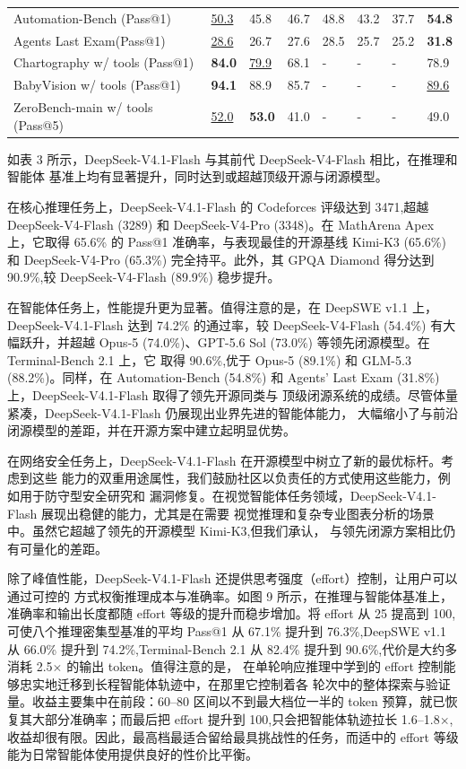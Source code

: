 \documentclass[
  10
]{article}
\begin{document}
{\begin{longtable}[]{@{}L{15.0em}lllllll@{}}
Automation-Bench (Pass@1) & \underline{50.3} & 45.8 & 46.7 & 48.8 & 43.2 & 37.7 &
\textbf{54.8} \\
Agents\textquotesingle{} Last Exam(Pass@1) & \underline{28.6} & 26.7 & 27.6 & 28.5 &
25.7 & 25.2 & \textbf{31.8} \\
Chartography w/ tools (Pass@1) & \textbf{84.0} & \underline{79.9} & 68.1 & - & - & - & 78.9 \\
BabyVision w/ tools (Pass@1) & \textbf{94.1} & 88.9 & 85.7 & - & - & - & \underline{89.6} \\
ZeroBench-main w/ tools (Pass@5) & \underline{52.0} & \textbf{53.0} & 41.0 & - & - & - & 49.0 \\
\end{longtable}
}

如表 3 所示，DeepSeek-V4.1-Flash 与其前代 DeepSeek-V4-Flash 相比，在推理和智能体
基准上均有显著提升，同时达到或超越顶级开源与闭源模型。

在核心推理任务上，DeepSeek-V4.1-Flash 的 Codeforces 评级达到 3471,超越
DeepSeek-V4-Flash (3289) 和 DeepSeek-V4-Pro (3348)。在 MathArena Apex 上，它取得
65.6\% 的 Pass@1 准确率，与表现最佳的开源基线 Kimi-K3 (65.6\%) 和
DeepSeek-V4-Pro (65.3\%) 完全持平。此外，其 GPQA Diamond 得分达到 90.9\%,较
DeepSeek-V4-Flash (89.9\%) 稳步提升。

在智能体任务上，性能提升更为显著。值得注意的是，在 DeepSWE v1.1 上，DeepSeek-V4.1-Flash
达到 74.2\% 的通过率，较 DeepSeek-V4-Flash (54.4\%) 有大幅跃升，并超越
Opus-5 (74.0\%)、GPT-5.6 Sol (73.0\%) 等领先闭源模型。在 Terminal-Bench 2.1 上，它
取得 90.6\%,优于 Opus-5 (89.1\%) 和 GLM-5.3 (88.2\%)。同样，在 Automation-Bench
(54.8\%) 和 Agents' Last Exam (31.8\%) 上，DeepSeek-V4.1-Flash 取得了领先开源同类与
顶级闭源系统的成绩。尽管体量紧凑，DeepSeek-V4.1-Flash 仍展现出业界先进的智能体能力，
大幅缩小了与前沿闭源模型的差距，并在开源方案中建立起明显优势。

在网络安全任务上，DeepSeek-V4.1-Flash 在开源模型中树立了新的最优标杆。考虑到这些
能力的双重用途属性，我们鼓励社区以负责任的方式使用这些能力，例如用于防守型安全研究和
漏洞修复。在视觉智能体任务领域，DeepSeek-V4.1-Flash 展现出稳健的能力，尤其是在需要
视觉推理和复杂专业图表分析的场景中。虽然它超越了领先的开源模型 Kimi-K3,但我们承认，
与领先闭源方案相比仍有可量化的差距。



除了峰值性能，DeepSeek-V4.1-Flash 还提供思考强度（effort）控制，让用户可以通过可控的
方式权衡推理成本与准确率。如图 9 所示，在推理与智能体基准上，准确率和输出长度都随
effort 等级的提升而稳步增加。将 effort 从 25 提高到 100,可使八个推理密集型基准的平均
Pass@1 从 67.1\% 提升到 76.3\%,DeepSWE v1.1 从 66.0\% 提升到 74.2\%,Terminal-Bench
2.1 从 82.4\% 提升到 90.6\%,代价是大约多消耗 2.5$\times$ 的输出 token。值得注意的是，
在单轮响应推理中学到的 effort 控制能够忠实地迁移到长程智能体轨迹中，在那里它控制着各
轮次中的整体探索与验证量。收益主要集中在前段：60--80 区间以不到最大档位一半的 token
预算，就已恢复其大部分准确率；而最后把 effort 提升到 100,只会把智能体轨迹拉长
1.6--1.8$\times$,收益却很有限。因此，最高档最适合留给最具挑战性的任务，而适中的
effort 等级能为日常智能体使用提供良好的性价比平衡。
\end{document}

